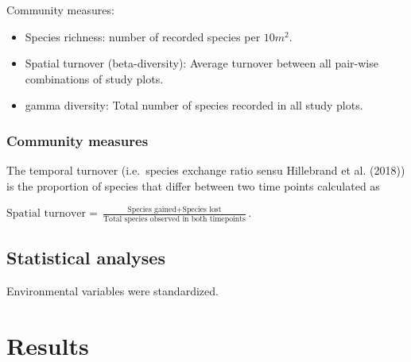 \documentclass[fleqn,10pt,lineno]{wlpeerj} %
\providecommand{\tightlist}{
\setlength{\itemsep}{0pt}\setlength{\parskip}{0pt}}
\begin{document}
Community measures:

\begin{itemize}
\tightlist
\item
  Species richness: number of recorded species per \(10m^2\).
\item
  Spatial turnover (beta-diversity): Average turnover between all
  pair-wise combinations of study plots.
\item
  gamma diversity: Total number of species recorded in all study plots.
\end{itemize}

\subsubsection{Community measures}\label{community-measures}

The temporal turnover (i.e.~species exchange ratio sensu Hillebrand et
al. (2018)) is the proportion of species that differ between two time
points calculated as

\(\text{Spatial turnover} = \frac{\text{Species gained} + \text{Species lost}}{\text{Total species observed in both timepoints}}\).

\subsection*{Statistical analyses}\label{statistical-analyses}

Environmental variables were standardized.

\section*{Results}\label{results}
\end{document}
